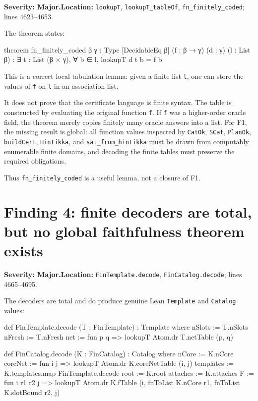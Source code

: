 \documentclass[11pt]{article}
\newcommand{\sev}[1]{\textbf{Severity: #1}}
\begin{document}
\sev{Major.}\quad \textbf{Location:} \texttt{lookupT}, \texttt{lookupT\_tableOf}, \texttt{fn\_finitely\_coded}; lines 4623--4653.

The theorem states:

\begin{leancode}
theorem fn_finitely_coded {β γ : Type} [DecidableEq β] (f : β → γ)
    (d : γ) (l : List β) :
    ∃ t : List (β × γ), ∀ b ∈ l, lookupT d t b = f b
\end{leancode}

This is a correct local tabulation lemma: given a finite list \texttt{l}, one can store the values of \texttt{f} on \texttt{l} in an association list.

It does not prove that the certificate language is finite syntax. The table is constructed by evaluating the original function \texttt{f}. If \texttt{f} was a higher-order oracle field, the theorem merely copies finitely many oracle answers into a list. For F1, the missing result is global: all function values inspected by \texttt{CatOk}, \texttt{SCat}, \texttt{PlanOk}, \texttt{buildCert}, \texttt{Hintikka}, and \texttt{sat\_from\_hintikka} must be drawn from computably enumerable finite domains, and decoding the finite tables must preserve the required obligations.

Thus \texttt{fn\_finitely\_coded} is a useful lemma, not a closure of F1.

\section{Finding 4: finite decoders are total, but no global faithfulness theorem exists}

\sev{Major.}\quad \textbf{Location:} \texttt{FinTemplate.decode}, \texttt{FinCatalog.decode}; lines 4665--4695.

The decoders are total and do produce genuine Lean \texttt{Template} and \texttt{Catalog} values:

\begin{leancode}
def FinTemplate.decode (T : FinTemplate) : Template where
  nSlots := T.nSlots
  nFresh := T.nFresh
  net := fun p q => lookupT Atom.dr T.netTable (p, q)

def FinCatalog.decode (K : FinCatalog) : Catalog where
  nCore := K.nCore
  coreNet := fun i j => lookupT Atom.dr K.coreNetTable (i, j)
  templates := K.templates.map FinTemplate.decode
  root := K.root
  attaches := K.attaches
  F := fun i r1 r2 j =>
    lookupT Atom.dr K.fTable
      (i, fnToList K.nCore r1, fnToList K.slotBound r2, j)
\end{leancode}
\end{document}
